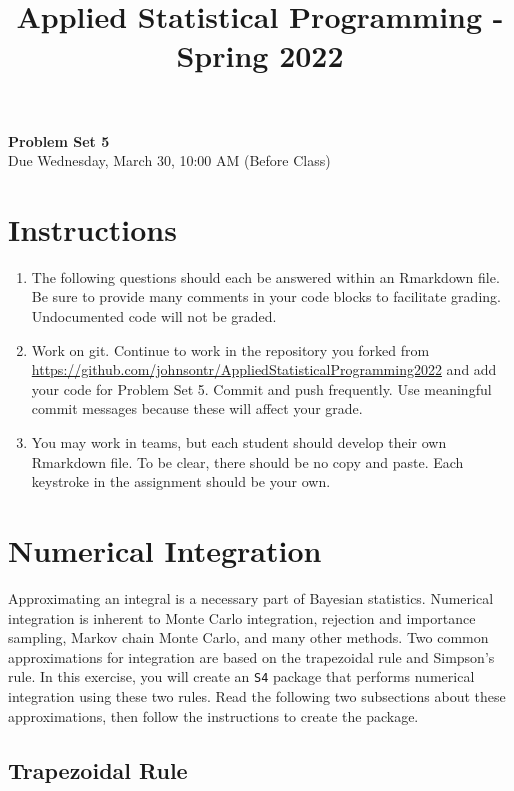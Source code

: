\documentclass[
]{article}
\title{Applied Statistical Programming - Spring 2022}
\author{}
\date{\vspace{-2.5em}}
\begin{document}
\maketitle

\begin{center}
{\Large{\textbf{Problem Set 5}}} \\
\vspace{4 bp}
Due Wednesday, March 30, 10:00 AM (Before Class) \\
\end{center}

\section*{Instructions}
\begin{enumerate}
  \item The following questions should each be answered within an Rmarkdown file. Be sure to provide many comments in your code blocks to facilitate grading. Undocumented code will not be graded.
  \item Work on git. Continue to work in the repository you forked from \url{https://github.com/johnsontr/AppliedStatisticalProgramming2022} and add your code for Problem Set 5. Commit and push frequently. Use meaningful commit messages because these will affect your grade.
  \item You may work in teams, but each student should develop their own Rmarkdown file. To be clear, there should be no copy and paste. Each keystroke in the assignment should be your own.
\end{enumerate}

\section*{Numerical Integration}

Approximating an integral is a necessary part of Bayesian statistics.
Numerical integration is inherent to Monte Carlo integration, rejection
and importance sampling, Markov chain Monte Carlo, and many other
methods. Two common approximations for integration are based on the
trapezoidal rule and Simpson's rule. In this exercise, you will create
an \texttt{S4} package that performs numerical integration using these
two rules. Read the following two subsections about these
approximations, then follow the instructions to create the package.

\subsection*{Trapezoidal Rule}
\end{document}
